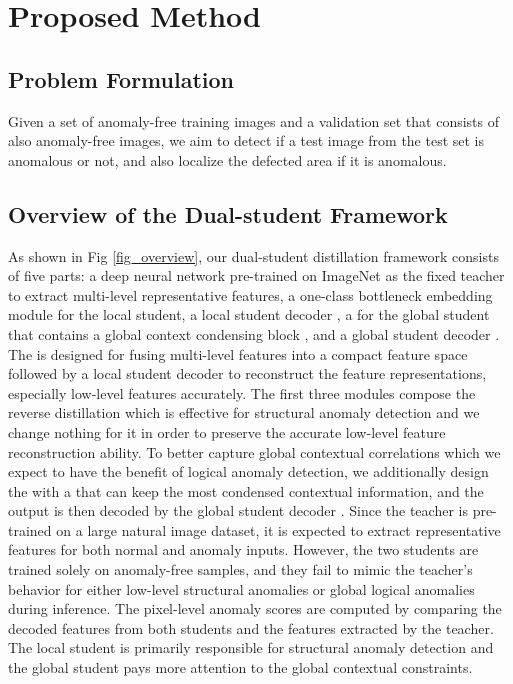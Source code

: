 \documentclass[10pt,twocolumn,letterpaper]{article}
\begin{document}
\section{Proposed Method}
\subsection{Problem Formulation}
Given a set of anomaly-free training images  and a validation set  that consists of also anomaly-free images, we aim to detect if a test image from the test set  is anomalous or not, and also localize the defected area if it is anomalous.

\subsection{Overview of the Dual-student Framework} 
As shown in Fig \ref{fig_overview}, our dual-student distillation framework consists of five parts: a deep neural network pre-trained on ImageNet as the fixed teacher  to extract multi-level representative features, a one-class bottleneck embedding module  for the local student, a local student decoder , a  for the global student that contains a global context condensing block , and a global student decoder . The  is designed for fusing multi-level features into a compact feature space followed by a local student decoder  to reconstruct the feature representations, especially low-level features accurately. The first three modules compose the reverse distillation \cite{deng2022anomaly} which is effective for structural anomaly detection and we change nothing for it in order to preserve the accurate low-level feature reconstruction ability. To better capture global contextual correlations which we expect to have the benefit of logical anomaly detection, we additionally design the  with a  that can keep the most condensed contextual information, and the output is then decoded by the global student decoder . Since the teacher  is pre-trained on a large natural image dataset, it is expected to extract representative features for both normal and anomaly inputs. However, the two students are trained solely on anomaly-free samples, and they fail to mimic the teacher's behavior for either low-level structural anomalies or global logical anomalies during inference. The pixel-level anomaly scores are computed by comparing the decoded features from both students and the features extracted by the teacher. The local student is primarily responsible for structural anomaly detection and the global student pays more attention to the global contextual constraints.
\end{document}
